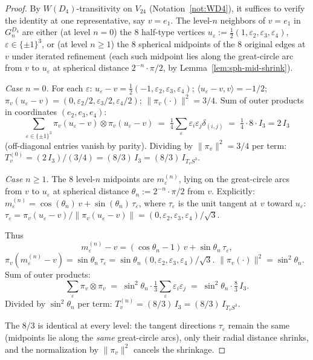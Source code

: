 \documentclass[11pt, a4paper]{amsart}
\theoremstyle{definition}
\begin{document}
\begin{proof}
By $W(D_4)$-transitivity on $V_{24}$ (Notation~\ref{not:WD4}), it
suffices to verify the identity at one representative, say $v =
e_1$. The level-$n$ neighbors of $v = e_1$ in $G_n^{D_4}$ are
either (at level $n = 0$) the $8$ half-type vertices
$u_\varepsilon := \tfrac{1}{2}(1, \varepsilon_2, \varepsilon_3,
\varepsilon_4)$, $\varepsilon \in \{\pm 1\}^3$, or (at level $n
\geq 1$) the $8$ spherical midpoints of the $8$ original edges
at $v$ under iterated refinement (each such midpoint lies along
the great-circle arc from $v$ to $u_\varepsilon$ at spherical
distance $2^{-n} \cdot \pi/2$, by
Lemma~\ref{lem:sph-mid-shrink}).

\emph{Case $n = 0$.} For each $\varepsilon$:
$u_\varepsilon - v = \tfrac{1}{2}(-1, \varepsilon_2, \varepsilon_3,
\varepsilon_4)$; $\langle u_\varepsilon - v, v\rangle = -1/2$;
$\pi_v(u_\varepsilon - v) = (0, \varepsilon_2/2, \varepsilon_3/2,
\varepsilon_4/2)$; $\|\pi_v(\cdot)\|^2 = 3/4$. Sum of outer
products in coordinates $(e_2, e_3, e_4)$:
\[
  \sum_{\varepsilon \in \{\pm 1\}^3}
    \pi_v(u_\varepsilon - v) \otimes \pi_v(u_\varepsilon - v)
    \;=\; \tfrac{1}{4} \sum_\varepsilon \varepsilon_i
       \varepsilon_j \delta_{(i, j)}
    \;=\; \tfrac{1}{4} \cdot 8 \cdot I_3 = 2\,I_3
\]
(off-diagonal entries vanish by parity). Dividing by $\|\pi_v\|^2
= 3/4$ per term: $T_v^{(0)} = (2\,I_3)/(3/4) = (8/3)\,I_3 =
(8/3)\,I_{T_v S^3}$.

\emph{Case $n \geq 1$.} The $8$ level-$n$ midpoints are
$m_\varepsilon^{(n)}$, lying on the great-circle arcs from $v$ to
$u_\varepsilon$ at spherical distance $\theta_n := 2^{-n} \cdot
\pi/2$ from $v$. Explicitly:
$m_\varepsilon^{(n)} = \cos(\theta_n)\,v +
\sin(\theta_n)\,\tau_\varepsilon$, where $\tau_\varepsilon$ is
the unit tangent at $v$ toward $u_\varepsilon$:
$\tau_\varepsilon = \pi_v(u_\varepsilon - v)/\|\pi_v(u_\varepsilon
- v)\| = (0, \varepsilon_2, \varepsilon_3,
\varepsilon_4)/\sqrt{3}$.

Thus
\[
  m_\varepsilon^{(n)} - v = (\cos\theta_n - 1)\,v +
    \sin\theta_n\,\tau_\varepsilon,
\]
$\pi_v(m_\varepsilon^{(n)} - v) = \sin\theta_n\,\tau_\varepsilon
= \sin\theta_n\,(0, \varepsilon_2, \varepsilon_3,
\varepsilon_4)/\sqrt{3}$. $\|\pi_v(\cdot)\|^2 = \sin^2\theta_n$.
Sum of outer products:
\[
  \sum_\varepsilon \pi_v \otimes \pi_v
    \;=\; \sin^2\theta_n \cdot \tfrac{1}{3}
       \sum_\varepsilon \varepsilon_i\varepsilon_j
    \;=\; \sin^2\theta_n \cdot \tfrac{8}{3}\,I_3.
\]
Divided by $\sin^2\theta_n$ per term:
$T_v^{(n)} = (8/3)\,I_3 = (8/3)\,I_{T_v S^3}$.

The $8/3$ is identical at every level: the tangent directions
$\tau_\varepsilon$ remain the same (midpoints lie along the
\emph{same} great-circle arcs), only their radial distance
shrinks, and the normalization by $\|\pi_v\|^2$ cancels the
shrinkage.
\end{proof}
\end{document}
